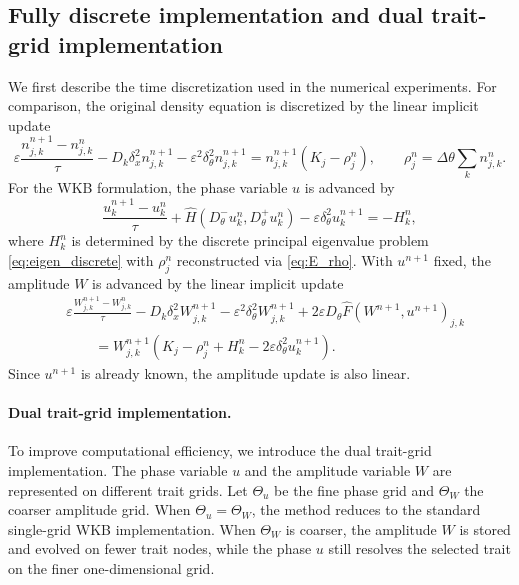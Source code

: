 \documentclass[11pt]{article}
\begin{document}
\subsection{Fully discrete implementation and dual trait-grid implementation}
\label{subsec:dual_grid}

We first describe the time discretization used in the numerical experiments.
For comparison, the original density equation is discretized by the linear
implicit update
\begin{equation}\label{eq:direct_density_fully}
    \varepsilon
    \frac{n_{j,k}^{n+1}-n_{j,k}^n}{\tau}
    -
    D_k\delta_x^2n_{j,k}^{n+1}
    -
    \varepsilon^2\delta_\theta^2n_{j,k}^{n+1}
    =
    n_{j,k}^{n+1}(K_j-\rho_j^n),
    \qquad
    \rho_j^n=\Delta\theta\sum_k n_{j,k}^n .
\end{equation}
For the WKB formulation, the phase variable $u$ is advanced by
\begin{equation}\label{eq:wkb_fully_u}
    \frac{u_k^{n+1}-u_k^n}{\tau}
    +
    \widehat H(D_\theta^-u_k^n,D_\theta^+u_k^n)
    -
    \varepsilon\delta_\theta^2u_k^{n+1}
    =
    -H_k^n, 
\end{equation}
where $H_k^n$ is determined by the discrete
principal eigenvalue problem \eqref{eq:eigen_discrete} 
with $ \rho_j^n$ reconstructed via \eqref{eq:E_rho}. 
With \(u^{n+1}\) fixed, the amplitude $W$ is advanced by the linear implicit
update
\begin{equation}\label{eq:wkb_fully_W}
\begin{aligned}
    &\varepsilon
    \frac{W_{j,k}^{n+1}-W_{j,k}^n}{\tau}
    -
    D_k\delta_x^2W_{j,k}^{n+1}
    -
    \varepsilon^2\delta_\theta^2W_{j,k}^{n+1}
    +
    2\varepsilon D_\theta\widehat F(W^{n+1},u^{n+1})_{j,k}
    \\
    &\qquad
    =
    W_{j,k}^{n+1}
    \left(
        K_j-\rho_j^n+H_k^n
        -2\varepsilon\delta_\theta^2u_k^{n+1}
    \right).
\end{aligned}
\end{equation}
Since \(u^{n+1}\) is already known, the amplitude update is also linear.  

\paragraph{Dual trait-grid implementation.} To improve computational efficiency, we introduce the dual trait-grid
implementation.  The phase variable \(u\) and the amplitude variable \(W\) are
represented on different trait grids.  Let \(\Theta_u\) be the fine phase grid
and \(\Theta_W\) the coarser amplitude grid.  When
\(\Theta_u=\Theta_W\), the method reduces to the standard single-grid WKB
implementation.  When \(\Theta_W\) is coarser, the amplitude \(W\) is stored and
evolved on fewer trait nodes, while the phase \(u\) still resolves the selected
trait on the finer one-dimensional grid.
\end{document}
